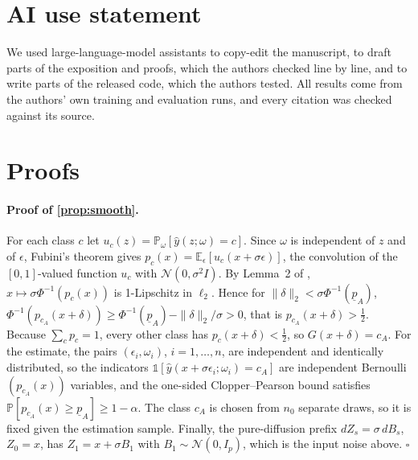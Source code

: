 \documentclass{article}
\theoremstyle{definition}
\newcommand{\Exp}{\mathbb{E}}
\newcommand{\Prob}{\mathbb{P}}
\begin{document}
\section*{AI use statement}
We used large-language-model assistants to copy-edit the manuscript, to draft
parts of the exposition and proofs, which the authors checked line by line, and
to write parts of the released code, which the authors tested. All results come
from the authors' own training and evaluation runs, and every citation was
checked against its source.




\newpage
\appendix

\section{Proofs}\label{app:proofs}
\paragraph{Proof of \cref{prop:smooth}.} For each class $c$ let
$u_c(z)=\Prob_\omega[\hat y(z;\omega)=c]$. Since $\omega$ is independent of $z$
and of $\epsilon$, Fubini's theorem gives
$p_c(x)=\Exp_\epsilon[u_c(x+\sigma\epsilon)]$, the convolution of the
$[0,1]$-valued function $u_c$ with $\mathcal N(0,\sigma^2I)$. By Lemma~2 of
\citet{salman2019smoothadv}, $x\mapsto\sigma\Phi^{-1}(p_c(x))$ is 1-Lipschitz in
$\ell_2$. Hence for $\|\delta\|_2<\sigma\Phi^{-1}(\underline p_A)$,
$\Phi^{-1}(p_{c_A}(x+\delta))\ge\Phi^{-1}(\underline p_A)-\|\delta\|_2/\sigma>0$,
that is $p_{c_A}(x+\delta)>\tfrac12$. Because $\sum_cp_c=1$, every other class has
$p_c(x+\delta)<\tfrac12$, so $G(x+\delta)=c_A$. For the estimate, the pairs
$(\epsilon_i,\omega_i)$, $i=1,\dots,n$, are independent and identically
distributed, so the indicators $\mathbb 1[\hat y(x+\sigma\epsilon_i;\omega_i)=c_A]$
are independent Bernoulli$(p_{c_A}(x))$ variables, and the one-sided
Clopper--Pearson bound \citep{clopper1934} satisfies
$\Prob[p_{c_A}(x)\ge\underline p_A]\ge1-\alpha$. The class $c_A$ is chosen from
$n_0$ separate draws, so it is fixed given the estimation sample. Finally, the
pure-diffusion prefix $dZ_s=\sigma\,dB_s$, $Z_0=x$, has $Z_1=x+\sigma B_1$ with
$B_1\sim\mathcal N(0,I_p)$, which is the input noise above. \hfill$\square$
\end{document}
